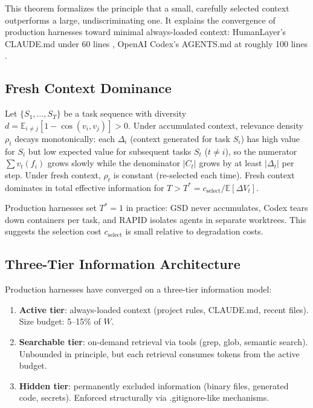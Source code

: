 This theorem formalizes the principle that a small, carefully selected context outperforms a large, undiscriminating one. It explains the convergence of production harnesses toward minimal always-loaded context: HumanLayer's CLAUDE.md under 60 lines \citep{humanlayer2025skillissue}, OpenAI Codex's AGENTS.md at roughly 100 lines \citep{openai2025codex}.

\subsection{Fresh Context Dominance}

\begin{proposition}
\label{prop:fresh-context}
Let $\{S_1, \ldots, S_T\}$ be a task sequence with diversity $d = \mathbb{E}_{i \neq j}[1 - \cos(v_i, v_j)] > 0$. Under accumulated context, relevance density $\rho_t$ decays monotonically: each $\Delta_i$ (context generated for task $S_i$) has high value for $S_i$ but low expected value for subsequent tasks $S_t$ ($t \neq i$), so the numerator $\sum v_t(f_i)$ grows slowly while the denominator $|C_t|$ grows by at least $|\Delta_t|$ per step. Under fresh context, $\rho_t$ is constant (re-selected each time). Fresh context dominates in total effective information for $T > T^* = c_{\text{select}} / \mathbb{E}[\Delta V_t]$.
\end{proposition}

Production harnesses set $T^* = 1$ in practice: GSD never accumulates, Codex tears down containers per task, and RAPID isolates agents in separate worktrees. This suggests the selection cost $c_{\text{select}}$ is small relative to degradation costs.

\subsection{Three-Tier Information Architecture}

Production harnesses have converged on a three-tier information model:

\begin{enumerate}
    \item \textbf{Active tier}: always-loaded context (project rules, CLAUDE.md, recent files). Size budget: 5--15\% of $W$.
    \item \textbf{Searchable tier}: on-demand retrieval via tools (grep, glob, semantic search). Unbounded in principle, but each retrieval consumes tokens from the active budget.
    \item \textbf{Hidden tier}: permanently excluded information (binary files, generated code, secrets). Enforced structurally via .gitignore-like mechanisms.
\end{enumerate}

